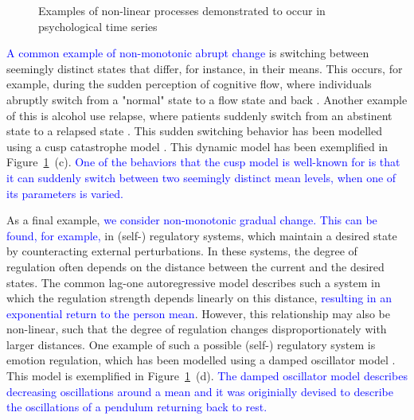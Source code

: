 \documentclass[man, floatsintext]{apa7}
\begin{document}
\begin{figure}[!t]
  \caption{Examples of non-linear processes demonstrated to occur in
    psychological time series}
  \label{fig:examplar_npn}
\end{figure}

\textcolor{blue}{A common example of non-monotonic abrupt change}
is switching between seemingly distinct
states that differ, for instance, in their means. This occurs, for example,
during the sudden perception of cognitive flow, where individuals abruptly
switch from a "normal" state to a flow state and back
\parencite{ceja_suddenly_2012}. Another example of this is alcohol use relapse,
where patients suddenly switch from an abstinent state to a relapsed state
\parencite{witkiewitz_modeling_2007}. This sudden switching behavior has been
modelled using a cusp catastrophe model
\parencite{van_der_maas_sudden_2003,chow_cusp_2015}. This dynamic model has
been exemplified in Figure~\ref{fig:examplar_npn}~(c). \textcolor{blue}{One of
  the behaviors that the cusp model is well-known for is that it can suddenly
  switch between two seemingly distinct mean levels, when one of its parameters
  is varied.}

As a final example, \textcolor{blue}{we consider non-monotonic gradual change.
  This can be found, for example,} in (self-) regulatory systems, which
maintain a desired state by counteracting external perturbations. In these
systems, the degree of regulation often depends on the distance between the
current and the desired states. The common lag-one autoregressive model
describes such a system in which the regulation strength depends linearly on
this distance, \textcolor{blue}{resulting in an exponential return to the
  person mean}. However, this relationship may also be non-linear, such that
the
degree of regulation changes disproportionately with larger distances. One
example of such a possible (self-) regulatory system is emotion regulation,
which has been modelled using a damped oscillator model
\parencite{chow_emotion_2005}. This model is exemplified in
Figure~\ref{fig:examplar_npn}~(d). \textcolor{blue}{The damped oscillator model
  describes decreasing oscillations around a mean and it was originially
  devised to describe the oscillations of a pendulum returning back to rest.}
\end{document}
